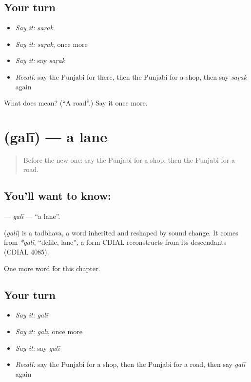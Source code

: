 \subsection*{Your turn}
\begin{itemize}
\raggedright
  \item \emph{Say it:} \emph{saṛak}
  \item \emph{Say it:} \emph{saṛak}, once more
  \item \emph{Say it:} say \emph{saṛak}
  \item \emph{Recall:} say the Punjabi for there, then the Punjabi for a shop, then say \emph{saṛak} again
\end{itemize}

\begin{tcolorbox}[breakable,colback=teal!4,colframe=teal!35!black,title={Before you move on}]
What does  mean? (\textquotedblleft{}A road\textquotedblright{}.) Say it once more.
\end{tcolorbox}
\section[\texorpdfstring{\pa{ਗਲੀ} (galī)}{ਗਲੀ (galī)}]{ (galī) — a lane}

\label{lesson:PA-C90-gali}



\begin{quote}
Before the new one: say the Punjabi for a shop, then the Punjabi for a road.
\end{quote}

\subsection*{You'll want to know: }
\textbf{} — \emph{galī} — \textquotedblleft{}a lane\textquotedblright{}.

\begin{cousinweb}
\textbf{} (\emph{galī}) is a tadbhava, a word inherited and reshaped by sound change. It comes from \emph{*galī}, \textquotedblleft{}defile, lane\textquotedblright{}, a form CDIAL reconstructs from its descendants (CDIAL 4085).
\end{cousinweb}

\begin{grammarlens}[title={What you've built}]
One more word for this chapter.
\end{grammarlens}

\subsection*{Your turn}
\begin{itemize}
\raggedright
  \item \emph{Say it:} \emph{galī}
  \item \emph{Say it:} \emph{galī}, once more
  \item \emph{Say it:} say \emph{galī}
  \item \emph{Recall:} say the Punjabi for a shop, then the Punjabi for a road, then say \emph{galī} again
\end{itemize}

